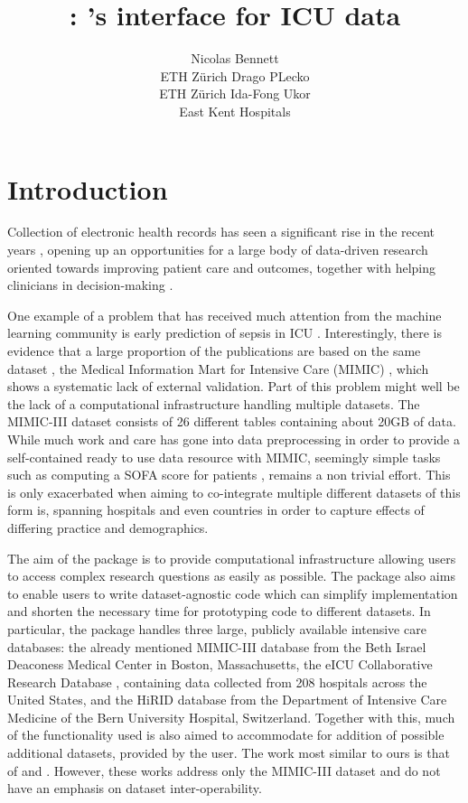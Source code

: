 \documentclass[
]{jss}
\author{
Nicolas Bennett\\ETH Zürich \And Drago PLecko\\ETH Zürich \And Ida-Fong Ukor\\East Kent Hospitals
}
\title{\pkg{ricu}: \proglang{R}'s interface for ICU data}
\begin{document}
\hypertarget{introduction}{%
\section{Introduction}\label{introduction}}

Collection of electronic health records has seen a significant rise in
the recent years \cite{evans2016electronic}, opening up an opportunities
for a large body of data-driven research oriented towards improving
patient care and outcomes, together with helping clinicians in
decision-making \cite{jiang2017artificial}.

One example of a problem that has received much attention from the
machine learning community is early prediction of sepsis in ICU
\cite{desautels2016prediction, nemati2018interpretable, futoma2017improved, kam2017learning}.
Interestingly, there is evidence that a large proportion of the
publications are based on the same dataset \cite{fleuren2019machine},
the Medical Information Mart for Intensive Care (MIMIC)
\cite{johnson2016mimic}, which shows a systematic lack of external
validation. Part of this problem might well be the lack of a
computational infrastructure handling multiple datasets. The MIMIC-III
dataset consists of 26 different tables containing about 20GB of data.
While much work and care has gone into data preprocessing in order to
provide a self-contained ready to use data resource with MIMIC,
seemingly simple tasks such as computing a SOFA score for patients
\citep{vincent1996sofa}, remains a non trivial effort. This is only
exacerbated when aiming to co-integrate multiple different datasets of
this form is, spanning hospitals and even countries in order to capture
effects of differing practice and demographics.

The aim of the  package is to provide computational
infrastructure allowing users to access complex research questions as
easily as possible. The package also aims to enable users to write
dataset-agnostic code which can simplify implementation and shorten the
necessary time for prototyping code to different datasets. In
particular, the package handles three large, publicly available
intensive care databases: the already mentioned MIMIC-III database from
the Beth Israel Deaconess Medical Center in Boston, Massachusetts, the
eICU Collaborative Research Database \cite{pollard2018eicu}, containing
data collected from 208 hospitals across the United States, and the
HiRID database \cite{faltys2020hirid} from the Department of Intensive
Care Medicine of the Bern University Hospital, Switzerland. Together
with this, much of the functionality used is also aimed to accommodate
for addition of possible additional datasets, provided by the user. The
work most similar to ours is that of \cite{adibuzzaman2016closing} and
\cite{wang2020mimic}. However, these works address only the MIMIC-III
dataset and do not have an emphasis on dataset inter-operability.
\end{document}
